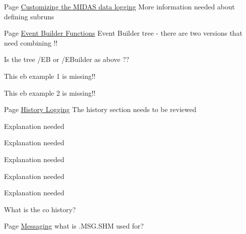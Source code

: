\label{todo__todo000005}
\hypertarget{todo__todo000005}{}
 
\begin{DoxyDescription}
\item[Page \hyperlink{F_Logging_Data}{Customizing the MIDAS data logging} ]More information needed about defining subruns


\end{DoxyDescription}

\label{todo__todo000001}
\hypertarget{todo__todo000001}{}
 
\begin{DoxyDescription}
\item[Page \hyperlink{FE_Event_Builder}{Event Builder Functions} ]Event Builder tree -\/ there are two versions that need combining !!



Is the tree /EB or /EBuilder as above ??



This eb example 1 is missing!!



This eb example 2 is missing!!


\end{DoxyDescription}

\label{todo__todo000007}
\hypertarget{todo__todo000007}{}
 
\begin{DoxyDescription}
\item[Page \hyperlink{F_History_logging}{History Logging} ]The history section needs to be reviewed



Explanation needed  



Explanation needed



Explanation needed  



Explanation needed  



Explanation needed   
\end{DoxyDescription}

What is the co history?

\label{todo__todo000006}
\hypertarget{todo__todo000006}{}
 
\begin{DoxyDescription}
\item[Page \hyperlink{F_Messaging}{Messaging} ]what is .MSG.SHM used for?


\end{DoxyDescription}

